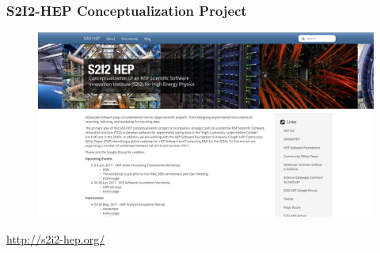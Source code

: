 \begin{frame}
\frametitle{S2I2-HEP Conceptualization Project}

\begin{figure}[htbp]
\begin{center}
\includegraphics[width=1.0\textwidth]{images/20170621-s2i2-hep-webpage.png}
\end{center}
\end{figure}

\small{\url{http://s2i2-hep.org/}}

\end{frame}


